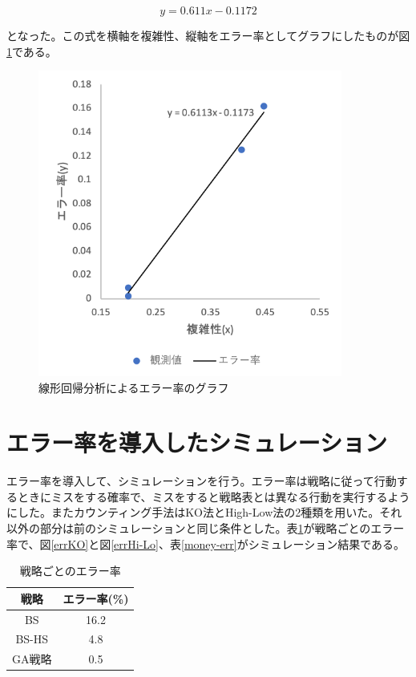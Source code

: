   \begin{equation}
    y=0.611x - 0.1172
  \end{equation}

となった。この式を横軸を複雑性、縦軸をエラー率としてグラフにしたものが図\ref{hoge2}である。

  \begin{figure}[H]
    \label{hoge2}
    \begin{center}
      \includegraphics[width=10cm]{figure/betsimulation-error_rate.png}
      \caption{線形回帰分析によるエラー率のグラフ}
    \end{center}
  \end{figure}

\section{エラー率を導入したシミュレーション}
エラー率を導入して、シミュレーションを行う。エラー率は戦略に従って行動するときにミスをする確率で、ミスをすると戦略表とは異なる行動を実行するようにした。またカウンティング手法はKO法とHigh-Low法の2種類を用いた。それ以外の部分は前のシミュレーションと同じ条件とした。表\ref{err}が戦略ごとのエラー率で、図\ref{errKO}と図\ref{errHi-Lo}、表\ref{money-err}がシミュレーション結果である。
\begin{table}[H]
 \caption{戦略ごとのエラー率\label{err}}
 \begin{center}
  \begin{tabular}{|c|c|}
  \hline 戦略 & エラー率(\%) \\
  \hline BS & 16.2\\
  \hline BS-HS & 4.8 \\
  \hline GA戦略 & 0.5\\
  \hline
  \end{tabular}
 \end{center}
\end{table}

